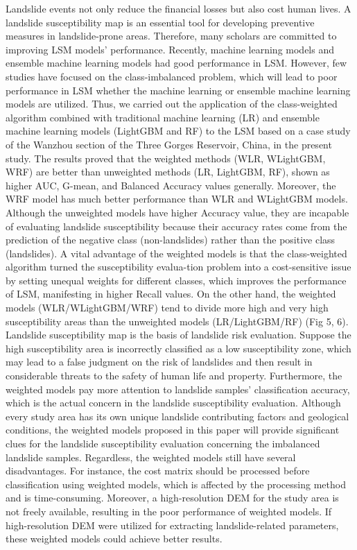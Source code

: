 \documentclass[a4paper,fleqn]{cas-sc}
\begin{document}
Landslide events not only reduce the financial losses but also cost human lives. A landslide susceptibility map is an essential tool for developing preventive measures in landslide-prone areas. Therefore, many scholars are committed to improving LSM models' performance. Recently, machine learning models and ensemble machine learning models had good performance in LSM. However, few studies have focused on the class-imbalanced problem, which will lead to poor performance in LSM whether the machine learning or ensemble machine learning models are utilized. Thus, we carried out the application of the class-weighted algorithm combined with traditional machine learning (LR) and ensemble machine learning models (LightGBM and RF) to the LSM based on a case study of the Wanzhou section of the Three Gorges Reservoir, China, in the present study. 
The results proved that the weighted methods (WLR, WLightGBM, WRF) are better than unweighted methods (LR, LightGBM, RF), shown as higher AUC, G-mean, and Balanced Accuracy values generally. Moreover, the WRF model has much better performance than WLR and WLightGBM models. Although the unweighted models have higher Accuracy value, they are incapable of evaluating landslide susceptibility because their accuracy rates come from the prediction of the negative class (non-landslides) rather than the positive class (landslides). A vital advantage of the weighted models is that the class-weighted algorithm turned the susceptibility evalua-tion problem into a cost-sensitive issue by setting unequal weights for different classes, which improves the performance of LSM, manifesting in higher Recall values. On the other hand, the weighted models (WLR/WLightGBM/WRF) tend to divide more high and very high susceptibility areas than the unweighted models (LR/LightGBM/RF) (Fig 5, 6). Landslide susceptibility map is the basis of landslide risk evaluation. Suppose the high susceptibility area is incorrectly classified as a low susceptibility zone, which may lead to a false judgment on the risk of landslides and then result in considerable threats to the safety of human life and property. Furthermore, the weighted models pay more attention to landslide samples' classification accuracy, which is the actual concern in the landslide susceptibility evaluation. Although every study area has its own unique landslide contributing factors and geological conditions, the weighted models proposed in this paper will provide significant clues for the landslide susceptibility evaluation concerning the imbalanced landslide samples. Regardless, the weighted models still have several disadvantages. For instance, the cost matrix should be processed before classiﬁcation using weighted models, which is affected by the processing method and is time-consuming. Moreover, a high-resolution DEM for the study area is not freely available, resulting in the poor performance of weighted models. If high-resolution DEM were utilized for extracting landslide-related parameters, these weighted models could achieve better results. 
\end{document}
